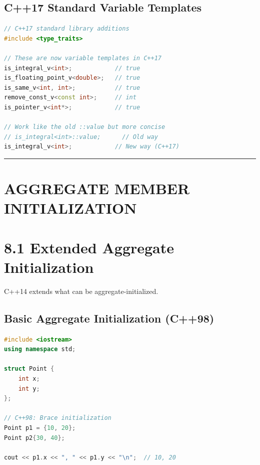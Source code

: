 \hypertarget{c17-standard-variable-templates}{%
\subsection{C++17 Standard Variable
Templates}\label{c17-standard-variable-templates}}

\begin{lstlisting}[language={C++}]
// C++17 standard library additions
#include <type_traits>

// These are now variable templates in C++17
is_integral_v<int>;            // true
is_floating_point_v<double>;   // true
is_same_v<int, int>;           // true
remove_const_v<const int>;     // int
is_pointer_v<int*>;            // true

// Work like the old ::value but more concise
// is_integral<int>::value;      // Old way
is_integral_v<int>;            // New way (C++17)
\end{lstlisting}

\begin{center}\rule{0.5\linewidth}{0.5pt}\end{center}

\hypertarget{aggregate-member-initialization}{%
\section{AGGREGATE MEMBER
INITIALIZATION}\label{aggregate-member-initialization}}

\hypertarget{extended-aggregate-initialization}{%
\section{8.1 Extended Aggregate
Initialization}\label{extended-aggregate-initialization}}

C++14 extends what can be aggregate-initialized.

\hypertarget{basic-aggregate-initialization-c98}{%
\subsection{Basic Aggregate Initialization
(C++98)}\label{basic-aggregate-initialization-c98}}

\begin{lstlisting}[language={C++}]
#include <iostream>
using namespace std;

struct Point {
    int x;
    int y;
};

// C++98: Brace initialization
Point p1 = {10, 20};
Point p2{30, 40};

cout << p1.x << ", " << p1.y << "\n";  // 10, 20
\end{lstlisting}

